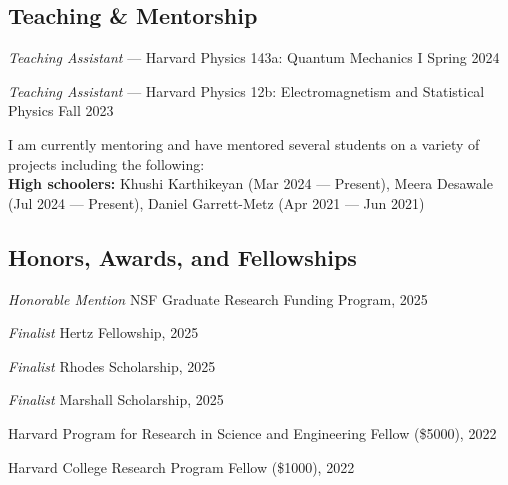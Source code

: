 \documentclass[12pt,letterpaper]{article}
\begin{document}
\subsection{Teaching \& Mentorship}
\begin{list}{}{\cvlist}
      \item \textit{Teaching Assistant} --- Harvard Physics 143a: Quantum Mechanics I \hfill \textcolor{niceblue}{Spring 2024}
      \item \textit{Teaching Assistant} --- Harvard Physics 12b: Electromagnetism and Statistical Physics \hfill \textcolor{niceblue}{Fall 2023}
\end{list}

I am currently mentoring and have mentored several students on a variety of projects including the following: \\
\textbf{High schoolers:} Khushi Karthikeyan (Mar 2024 --- Present), Meera Desawale (Jul 2024 --- Present), Daniel Garrett-Metz (Apr 2021 --- Jun 2021)

\subsection{Honors, Awards, and Fellowships}
\begin{list}{}{\cvlist}

  \item \textit{Honorable Mention} NSF Graduate Research Funding Program, 2025
  \item \textit{Finalist} Hertz Fellowship, 2025
  \item \textit{Finalist} Rhodes Scholarship, 2025
  \item \textit{Finalist} Marshall Scholarship, 2025
  \item Harvard Program for Research in Science and Engineering Fellow (\$5000), 2022
  \item Harvard College Research Program Fellow (\$1000), 2022

\end{list}
\end{document}
